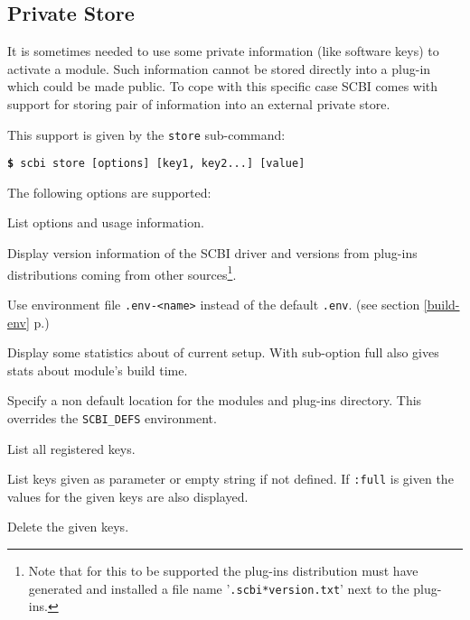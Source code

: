 \documentclass[a4paper,12pt,twoside]{article}
\newcommand{\code}[1]{\texttt{#1}}
\newcommand{\seeref}[1]{see section \ref{#1} p.\pageref{#1}}
\newcommand{\file}[1]{'{\texttt{#1}}'}
\newcommand{\cmd}[1]{\tabto{1cm}\hspace{0.5cm}\texttt{\textbf{\$} #1}}
\newcommand{\ddash}{-{}-}
\begin{document}
\subsection{Private Store}
\label{private store}
\label{store}

It is sometimes needed to use some private information (like software keys) to activate a module. Such information cannot be stored directly into a plug-in which could be made public. To cope with this specific case SCBI comes with support for storing pair of information into an external private store.

This support is given by the \code{store} sub-command:

\cmd{scbi store [options] [key1, key2...] [value]}

The following options are supported:

\begin{description}[font=\texttt]
	\item[-h | \ddash{}help] List options and usage information.

	\item[-v | \ddash{}version] Display version information of the SCBI driver and versions from plug-ins distributions coming from other sources\footnote{Note that for this to be supported the plug-ins distribution must have generated and installed a file name \file{.scbi*version.txt} next to the plug-ins.}.

	\item[-e | \ddash{}env=<name>] Use environment file \code{.env-<name>} instead of the default \code{.env}. (\seeref{build-env})

	\item[\ddash{}stat:{[}full{]}] Display some statistics about of current setup. With sub-option full also gives stats about module's build time.

	\item[\ddash{}plugins=<directory>] Specify a non default location for the modules and plug-ins directory. This overrides the \code{SCBI\_DEFS} environment.

	\item[\ddash{}list-keys] List all registered keys.

	\item[\ddash{}list{[}:full{]}] List keys given as parameter or empty string if not defined. If \code{:full} is given the values for the given keys are also displayed.

	\item[-d | \ddash{}delete] Delete the given keys.
\end{description}
\end{document}
